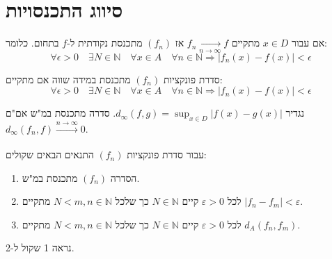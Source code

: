 \documentclass{tstextbook}
\begin{document}
\section{סיווג התכנסויות}

\begin{definition}
אם עבור \(x\in D\) מתקיים \(f_n \xrightarrow[n\rightarrow\infty]{} f\) אז \((f_n)\) מתכנסת נקודתית ל-\(f\) בתחום. כלומר:
$$\forall \epsilon > 0 \quad \exists N \in\mathbb{N}\quad \forall x\in A \quad\forall n\in\mathbb{N} \Rightarrow |f_n(x)-f(x)|<\epsilon$$

\end{definition}
\begin{definition}
סדרת פונקציות \((f_{n})\) מתכנסת במידה שווה אם מתקיים:
$$\forall \epsilon > 0 \quad \exists N \in\mathbb{N}\quad \forall x\in A \quad\forall n\in\mathbb{N} \Rightarrow |f_n(x)-f(x)|<\epsilon$$

\end{definition}
\begin{proposition}
נגדיר \(d_\infty(f,g)=\sup_{x\in D}|f(x)-g(x)|\). סדרה מתכנסת במ"ש אם"ם \(d_\infty(f_n,f)\xrightarrow[]{n\rightarrow\infty} 0\).

\end{proposition}
\begin{proposition}
עבור סדרת פונקציות \((f_{n})\) התנאים הבאים שקולים:

  \begin{enumerate}
    \item הסדרה \((f_{n})\) מתכנסת במ"ש. 


    \item לכל \(\varepsilon>0\) קיים \(N\in \mathbb N\) כך שלכל \(N<m,n\in\mathbb N\) מתקיים \(|f_n-f_m|<\varepsilon\). 


    \item לכל \(\varepsilon>0\) קיים \(N\in \mathbb N\) כך שלכל \(N<m,n\in\mathbb N\) מתקיים \(d_A(f_n, f_m)\). 


  \end{enumerate}
\end{proposition}
נראה 1 שקול ל-2.
\end{document}
